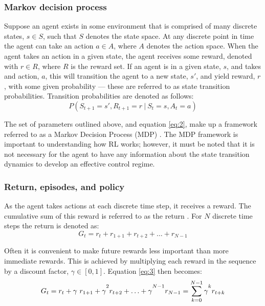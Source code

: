 \subsubsection{Markov decision process}\label{mdp1}
Suppose an agent exists in some environment that is comprised of many discrete states, $s \in S$, such that $S$ denotes the state space. At any discrete point in time the agent can take an action $a \in A$, where $A$ denotes the action space. When the agent takes an action in a given state, the agent receives some reward, denoted with $r \in R$, where $R$ is the reward set. If an agent is in a given state, $s$, and takes and action, $a$, this will transition the agent to a new state, $s'$, and yield reward, $r$, with some given probability --- these are referred to as state transition probabilities. Transition probabilities are denoted as follows:
\begin{equation}
P(S_{t+1}=s', R_{t+1}=r \ | \ S_t = s, A_t = a)\label{eq:2}
\end{equation}

The set of parameters outlined above, and equation \ref{eq:2}, make up a framework referred to as a Markov Decision Process (MDP) \cite{Bellm1957}. The MDP framework is important to understanding how RL works; however, it must be noted that it is not necessary for the agent to have any information about the state transition dynamics to develop an effective control regime.

\subsubsection{Return, episodes, and policy}\label{mdp2}
As the agent takes actions at each discrete time step, it receives a reward. The cumulative sum of this reward is referred to as the return \cite{openai2018}. For $N$ discrete time steps the return is denoted as:
\begin{equation}
G_t = r_t + r_{1+1} + r_{t+2} + \ldots + r_{N-1}\label{eq:3}
\end{equation}

Often it is convenient to make future rewards less important than more immediate rewards. This is achieved by multiplying each reward in the sequence by a discount factor, $\gamma \in [0,1]$. Equation \ref{eq:3} then becomes:
\begin{equation}
G_t = r_t + \gamma \ r_{1+1} + \gamma\mystrut^2 r_{t+2} + \ldots + \gamma\mystrut^{N-1} r_{N-1} = \sum_{k = 0}^{N-1} \gamma\mystrut^k r_{t+k}
\end{equation}

